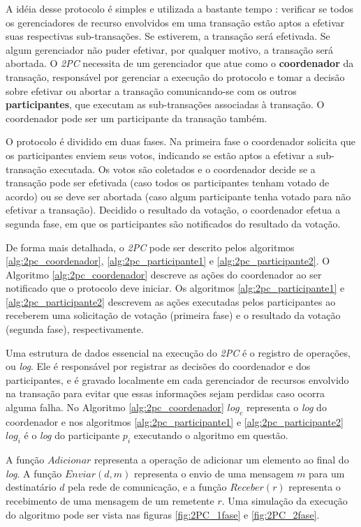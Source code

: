 \documentclass[11pt,twoside,a4paper]{book}
\begin{document}
A idéia desse protocolo é simples e utilizada a bastante tempo \cite{2pc}:
verificar se todos os gerenciadores de recurso envolvidos em uma transação estão aptos a efetivar suas respectivas sub-transações. Se estiverem, a 
transação será efetivada. Se algum gerenciador não puder efetivar, por qualquer motivo, a transação será abortada. O \emph{2PC} necessita de um 
gerenciador que atue como o \textbf{coordenador} da transação, responsável por gerenciar a execução do protocolo e tomar a decisão sobre efetivar 
ou abortar a transação comunicando-se com os outros \textbf{participantes}, que executam as sub-transações associadas à transação. O coordenador 
pode ser um participante da transação também.

O protocolo é dividido em duas fases. Na primeira fase o coordenador solicita que os participantes enviem seus votos, indicando se estão aptos a 
efetivar a sub-transação executada. Os votos são coletados e o coordenador decide se a transação pode ser efetivada (caso todos os participantes 
tenham votado de acordo) ou se deve ser abortada (caso algum participante tenha votado para não efetivar a transação). Decidido o resultado da 
votação, o coordenador efetua a segunda fase, em que os participantes são notificados do resultado da votação. 

De forma mais detalhada, o \emph{2PC} pode ser descrito pelos algoritmos \ref{alg:2pc_coordenador}, \ref{alg:2pc_participante1} e 
\ref{alg:2pc_participante2}. O Algoritmo \ref{alg:2pc_coordenador} descreve as ações do coordenador ao ser notificado que o protocolo deve 
iniciar. Os algoritmos \ref{alg:2pc_participante1} e \ref{alg:2pc_participante2} descrevem as ações executadas pelos participantes ao receberem 
uma solicitação de votação (primeira fase) e o resultado da votação (segunda fase), respectivamente. 

Uma estrutura de dados essencial na execução do \emph{2PC} é o registro de operações, ou \emph{log}. Ele é responsável por registrar as decisões 
do coordenador e dos participantes, e é gravado localmente em cada gerenciador de recursos envolvido na transação para evitar que essas 
informações sejam perdidas caso ocorra alguma falha. No Algoritmo \ref{alg:2pc_coordenador} $log_c$ representa o \emph{log} do coordenador e nos 
algoritmos \ref{alg:2pc_participante1} e \ref{alg:2pc_participante2} $log_i$ é o \emph{log} do participante $p_i$ executando o algoritmo em 
questão.

A função $Adicionar$ representa a operação de adicionar um elemento ao final do
\emph{log}. A função $Enviar(d, m)$ representa o envio de uma mensagem $m$ para
um destinatário $d$ pela rede de comunicação, e a função $Receber(r)$ representa
o recebimento de uma mensagem de um remetente $r$. Uma simulação da execução do
algoritmo pode ser vista nas figuras \ref{fig:2PC_1fase} e \ref{fig:2PC_2fase}.
\end{document}
